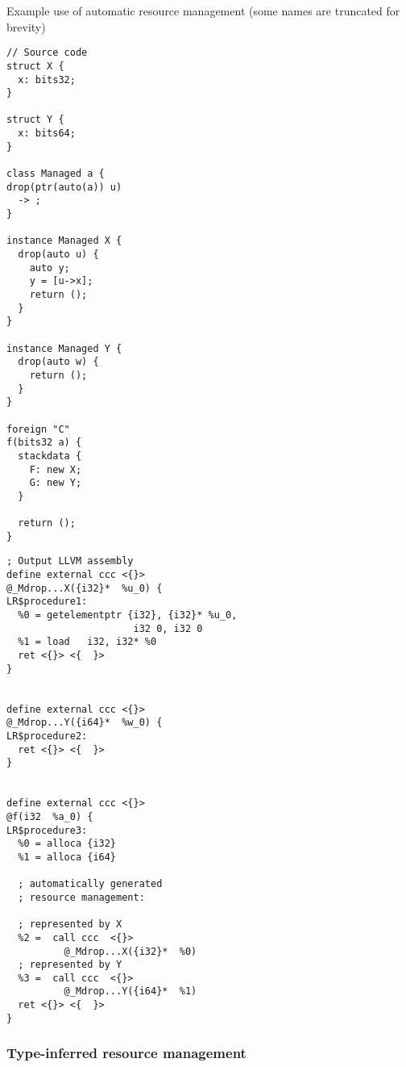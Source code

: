 \begin{codex}
    \small
    \caption{Example use of automatic resource management (some names are truncated for brevity)}
    \label{lst:resource}
    \begin{center}
    \begin{minipage}{0.4\linewidth}
    \begin{lstlisting}[basicstyle=\scriptsize\ttfamily]
// Source code
struct X {
  x: bits32;
}

struct Y {
  x: bits64;
}

class Managed a {
drop(ptr(auto(a)) u)
  -> ;
}

instance Managed X {
  drop(auto u) {
    auto y;
    y = [u->x];
    return ();
  }
}

instance Managed Y {
  drop(auto w) {
    return ();
  }
}

foreign "C"
f(bits32 a) {
  stackdata {
    F: new X;
    G: new Y;
  }

  return ();
}
    \end{lstlisting}
    \end{minipage}%
    \begin{minipage}{0.6\linewidth}
    \begin{lstlisting}[style=llvmStyle,basicstyle=\scriptsize\ttfamily]
; Output LLVM assembly
define external ccc <{}>
@_Mdrop...X({i32}*  %u_0) {
LR$procedure1:
  %0 = getelementptr {i32}, {i32}* %u_0,
                      i32 0, i32 0
  %1 = load   i32, i32* %0
  ret <{}> <{  }>
}


define external ccc <{}>
@_Mdrop...Y({i64}*  %w_0) {
LR$procedure2:
  ret <{}> <{  }>
}


define external ccc <{}>
@f(i32  %a_0) {
LR$procedure3:
  %0 = alloca {i32}
  %1 = alloca {i64}

  ; automatically generated
  ; resource management:

  ; represented by X
  %2 =  call ccc  <{}>
          @_Mdrop...X({i32}*  %0)
  ; represented by Y
  %3 =  call ccc  <{}>
          @_Mdrop...Y({i64}*  %1)
  ret <{}> <{  }>
}
    \end{lstlisting}
    \end{minipage}
    \end{center}
\end{codex}

\subsubsection{Type-inferred resource management}

